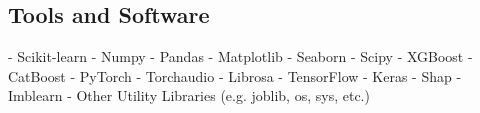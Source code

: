 \subsection{Tools and Software}

- Scikit-learn 
- Numpy
- Pandas
- Matplotlib
- Seaborn
- Scipy
- XGBoost
- CatBoost
- PyTorch
- Torchaudio
- Librosa
- TensorFlow
- Keras
- Shap
- Imblearn
- Other Utility Libraries (e.g. joblib, os, sys, etc.)